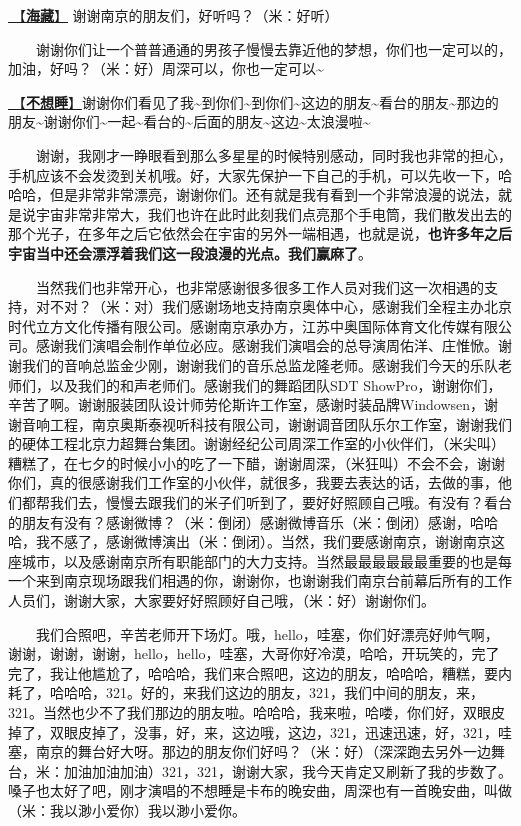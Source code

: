 \documentclass[]{ctexbook}
\begin{document}
\hyperref[ocean-treasure]{🎵【\textbf{海藏}】} 谢谢南京的朋友们，好听吗？（米：好听）

  谢谢你们让一个普普通通的男孩子慢慢去靠近他的梦想，你们也一定可以的，加油，好吗？（米：好）周深可以，你也一定可以\textasciitilde{}

\hyperref[donot-want-to-sleep]{🎵【\textbf{不想睡}】}谢谢你们看见了我\textasciitilde 到你们\textasciitilde 到你们\textasciitilde 这边的朋友\textasciitilde 看台的朋友\textasciitilde 那边的朋友\textasciitilde 谢谢你们\textasciitilde 一起\textasciitilde 看台的\textasciitilde 后面的朋友\textasciitilde 这边\textasciitilde 太浪漫啦\textasciitilde{}

  谢谢，我刚才一睁眼看到那么多星星的时候特别感动，同时我也非常的担心，手机应该不会发烫到关机哦。好，大家先保护一下自己的手机，可以先收一下，哈哈哈，但是非常非常漂亮，谢谢你们。还有就是我有看到一个非常浪漫的说法，就是说宇宙非常非常大，我们也许在此时此刻我们点亮那个手电筒，我们散发出去的那个光子，在多年之后它依然会在宇宙的另外一端相遇，也就是说，\textbf{也许多年之后宇宙当中还会漂浮着我们这一段浪漫的光点。我们赢麻了}。

  当然我们也非常开心，也非常感谢很多很多工作人员对我们这一次相遇的支持，对不对？（米：对）我们感谢场地支持南京奥体中心，感谢我们全程主办北京时代立方文化传播有限公司。感谢南京承办方，江苏中奥国际体育文化传媒有限公司。感谢我们演唱会制作单位必应。感谢我们演唱会的总导演周佑洋、庄惟惞。谢谢我们的音响总监金少刚，谢谢我们的音乐总监龙隆老师。感谢我们今天的乐队老师们，以及我们的和声老师们。感谢我们的舞蹈团队SDT ShowPro，谢谢你们，辛苦了啊。谢谢服装团队设计师劳伦斯许工作室，感谢时装品牌Windowsen，谢谢音响工程，南京奥斯泰视听科技有限公司，谢谢调音团队乐尔工作室，谢谢我们的硬体工程北京力超舞台集团。谢谢经纪公司周深工作室的小伙伴们，（米尖叫）糟糕了，在七夕的时候小小的吃了一下醋，谢谢周深，（米狂叫）不会不会，谢谢你们，真的很感谢我们工作室的小伙伴，就很多，我要去表达的话，去做的事，他们都帮我们去，慢慢去跟我们的米子们听到了，要好好照顾自己哦。有没有？看台的朋友有没有？感谢微博？（米：倒闭）感谢微博音乐（米：倒闭）感谢，哈哈哈，我不感了，感谢微博演出（米：倒闭）。当然，我们要感谢南京，谢谢南京这座城市，以及感谢南京所有职能部门的大力支持。当然最最最最最最重要的也是每一个来到南京现场跟我们相遇的你，谢谢你，也谢谢我们南京台前幕后所有的工作人员们，谢谢大家，大家要好好照顾好自己哦，（米：好）谢谢你们。

  我们合照吧，辛苦老师开下场灯。哦，hello，哇塞，你们好漂亮好帅气啊，谢谢，谢谢，谢谢，hello，hello，哇塞，大哥你好冷漠，哈哈，开玩笑的，完了完了，我让他尴尬了，哈哈哈，我们来合照吧，这边的朋友，哈哈哈，糟糕，要内耗了，哈哈哈，321。好的，来我们这边的朋友，321，我们中间的朋友，来，321。当然也少不了我们那边的朋友啦。哈哈哈，我来啦，哈喽，你们好，双眼皮掉了，双眼皮掉了，没事，好，来，这边哦，这边，321，迅速迅速，好，321，哇塞，南京的舞台好大呀。那边的朋友你们好吗？（米：好）（深深跑去另外一边舞台，米：加油加油加油）321，321，谢谢大家，我今天肯定又刷新了我的步数了。嗓子也太好了吧，刚才演唱的不想睡是卡布的晚安曲，周深也有一首晚安曲，叫做（米：我以渺小爱你）我以渺小爱你。
\end{document}
